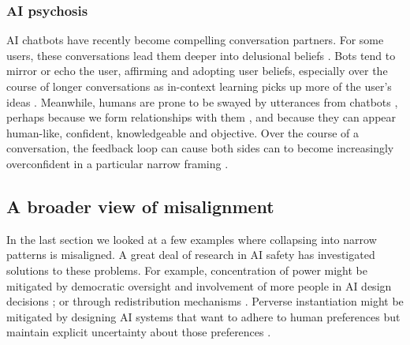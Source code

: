 \documentclass[12pt]{article}
\begin{document}



\subsubsection{AI psychosis} 

AI chatbots have recently become compelling conversation partners. For some users, these conversations lead them deeper into delusional beliefs \citep{tiku2025psychosis, morrin2025delusions, ostergaard2025generative, yeung2025psychogenic}. Bots tend to mirror or echo the user, affirming and adopting user beliefs, especially over the course of longer conversations as in-context learning picks up more of the user's ideas \citep{shanahan2023role, perez2022discovering, sharma2023sycophancy, weilnhammer2026vulnerability}. Meanwhile, humans are prone to be swayed by utterances from chatbots \citep{costello2024durably, luettgau2025people, potter2024hidden}, perhaps because we form relationships with them \citep{kirk2025human}, and because they can appear human-like, confident, knowledgeable and objective. Over the course of a conversation, the feedback loop can cause both sides can to become increasingly overconfident in a particular narrow framing \citep{dohnany2025technological}. 


\subsection{A broader view of misalignment}

In the last section we looked at a few examples where collapsing into narrow patterns is misaligned. A great deal of research in AI safety has investigated solutions to these problems. For example, concentration of power might be mitigated by democratic oversight and involvement of more people in AI design decisions \citep{birhane2022power, sloane2022participation, selbst2019fairness, lazar2023ai, dafoe2018ai, openai2023democratic}; or through redistribution mechanisms \citep{okeefe2020windfall, sharp2025agentic, gough2019universal, susskind2020world}. Perverse instantiation might be mitigated by designing AI systems that want to adhere to human preferences but maintain explicit uncertainty about those preferences \citep{russell2019human, hadfieldmenell2017off, hadfieldmenell2016cooperative, shah2020benefits, jeon2020reward}. 
\end{document}
